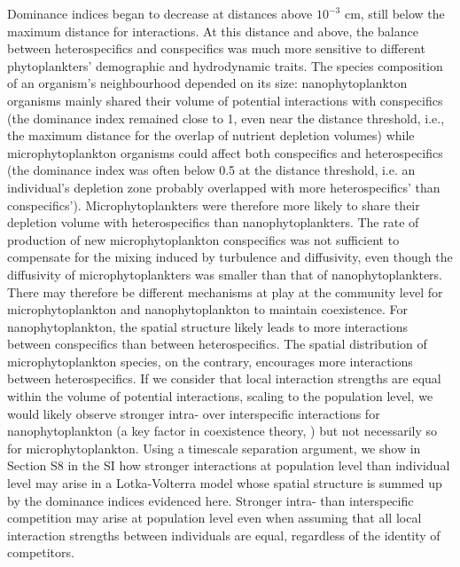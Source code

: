 \documentclass[12pt,english]{article}
\begin{document}
Dominance indices began to decrease at distances above $10^{-3}$
cm, still below the maximum distance for interactions. At this distance
and above, the balance between heterospecifics and conspecifics was
much more sensitive to different phytoplankters' demographic and hydrodynamic
traits. The species composition of an organism's neighbourhood depended
on its size: nanophytoplankton organisms mainly shared their volume
of potential interactions with conspecifics (the dominance index remained
close to 1, even near the distance threshold, i.e., the maximum distance
for the overlap of nutrient depletion volumes) while microphytoplankton
organisms could affect both conspecifics and heterospecifics (the
dominance index was often below 0.5 at the distance threshold, i.e.
an individual's depletion zone probably overlapped with more heterospecifics'
than conspecifics'). Microphytoplankters were therefore more likely
to share their depletion volume with heterospecifics than nanophytoplankters.
The rate of production of new microphytoplankton conspecifics was
not sufficient to compensate for the mixing induced by turbulence
and diffusivity, even though the diffusivity of microphytoplankters
was smaller than that of nanophytoplankters. There may therefore be
different mechanisms at play at the community level for microphytoplankton
and nanophytoplankton to maintain coexistence. For nanophytoplankton,
the spatial structure likely leads to more interactions between conspecifics
than between heterospecifics. The spatial distribution of microphytoplankton
species, on the contrary, encourages more interactions between heterospecifics.
If we consider that local interaction strengths are equal within the
volume of potential interactions, scaling to the population level,
we would likely observe stronger intra- over interspecific interactions
for nanophytoplankton (a key factor in coexistence theory, \citealp{barabas_self-regulation_2017})
but not necessarily so for microphytoplankton. Using a timescale separation
argument, we show in Section S8 in the SI how stronger interactions
at population level than individual level may arise in a Lotka-Volterra
model whose spatial structure is summed up by the dominance indices
evidenced here. Stronger intra- than interspecific competition may
arise at population level even when assuming that all local interaction
strengths between individuals are equal, regardless of the identity
of competitors.
\end{document}

